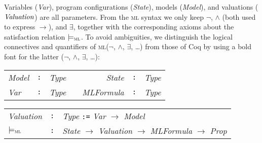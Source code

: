 \documentclass[conference]{IEEEtran}
\renewcommand{\implies}{\rightarrow}
\newcommand{\ML}{\textsc{ml}\xspace}
\newcommand{\modelsml}{\models_\ML}
\newcommand{\coq}[1]{{\small \textit{#1}}}
\newcommand{\coqtt}[1]{{\small \texttt{#1}}}
\newcommand{\cnot}{\pmb{\lnot}}
\newcommand{\cand}{\pmb{\land}}
\newcommand{\cexists}{\pmb{\exists}}
\begin{document}
Variables (\coq{Var}), program configurations (\coq{State}), models (\coq{Model}), and valuations ($\coq{Valuation}$) are all parameters.
From the \ML syntax we only keep $\lnot$, $\land$ (both used to express $\implies$), and $\exists$, together with the corresponding axioms about the satisfaction relation $\modelsml$.
To avoid ambiguities, we distinguish the logical connectives and quantifiers of \ML ($\lnot$, $\land$, $\exists$, \ldots) from those of Coq by using a bold font for the latter ($\cnot$, $\cand$, $\cexists$, \ldots):\\



\noindent
\begin{minipage}{\textwidth}
\begin{tabular}{lclcrcr}
\coq{Model} & \coqtt{:}& \coq{Type} &\hspace*{5ex}&
\coq{State} & \coqtt{:}& \coq{Type}\\
\coq{Var} & \coqtt{:}& \coq{Type} &\hspace*{5ex}&
\coq{MLFormula} & \coqtt{:}& \coq{Type}\\[1ex]
\end{tabular}
\end{minipage}
\begin{minipage}{\textwidth}
\begin{tabular}{lcl}
\coq{Valuation} & \coqtt{:}& \coq{Type} \coqtt{:=} \coq{Var} $\to$ \coq{Model}\\
\coq{$\modelsml$} & \coqtt{:}& \coq{State} $\to$ \coq{Valuation} $\to$ \coq{MLFormula} $\to$ \coq{Prop}\\[1ex]
\end{tabular}
\end{minipage}
\end{document}
